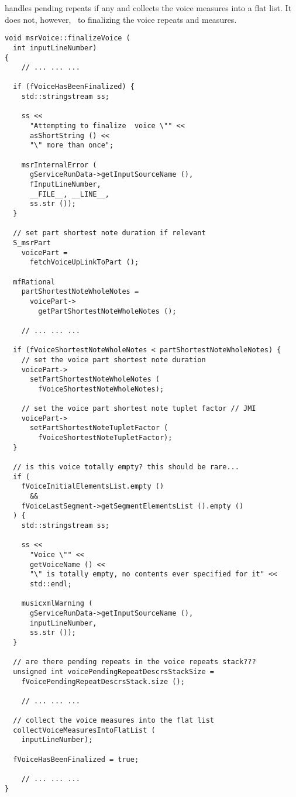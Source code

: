  handles pending repeats if any and collects the voice measures into a flat list. It does not, however, \cascade\ to finalizing the voice repeats and measures.
\begin{lstlisting}[language=CPlusPlus]
void msrVoice::finalizeVoice (
  int inputLineNumber)
{
	// ... ... ...

  if (fVoiceHasBeenFinalized) {
    std::stringstream ss;

    ss <<
      "Attempting to finalize  voice \"" <<
      asShortString () <<
      "\" more than once";

    msrInternalError (
      gServiceRunData->getInputSourceName (),
      fInputLineNumber,
      __FILE__, __LINE__,
      ss.str ());
  }

  // set part shortest note duration if relevant
  S_msrPart
    voicePart =
      fetchVoiceUpLinkToPart ();

  mfRational
    partShortestNoteWholeNotes =
      voicePart->
        getPartShortestNoteWholeNotes ();

	// ... ... ...

  if (fVoiceShortestNoteWholeNotes < partShortestNoteWholeNotes) {
    // set the voice part shortest note duration
    voicePart->
      setPartShortestNoteWholeNotes (
        fVoiceShortestNoteWholeNotes);

    // set the voice part shortest note tuplet factor // JMI
    voicePart->
      setPartShortestNoteTupletFactor (
        fVoiceShortestNoteTupletFactor);
  }

  // is this voice totally empty? this should be rare...
  if (
    fVoiceInitialElementsList.empty ()
      &&
    fVoiceLastSegment->getSegmentElementsList ().empty ()
  ) {
    std::stringstream ss;

    ss <<
      "Voice \"" <<
      getVoiceName () <<
      "\" is totally empty, no contents ever specified for it" <<
      std::endl;

    musicxmlWarning (
      gServiceRunData->getInputSourceName (),
      inputLineNumber,
      ss.str ());
  }

  // are there pending repeats in the voice repeats stack???
  unsigned int voicePendingRepeatDescrsStackSize =
    fVoicePendingRepeatDescrsStack.size ();

	// ... ... ...

  // collect the voice measures into the flat list
  collectVoiceMeasuresIntoFlatList (
    inputLineNumber);

  fVoiceHasBeenFinalized = true;

	// ... ... ...
}
\end{lstlisting}


